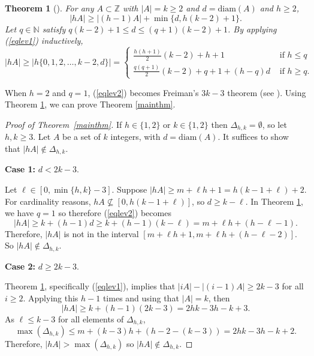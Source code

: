 \documentclass{daj}
\newtheorem{theorem}{Theorem}
\theoremstyle{definition}
\theoremstyle{remark}
\numberwithin{equation}{section}
\numberwithin{theorem}{section}
\newcommand{\N}{\mathbb{N}}
\newcommand{\Z}{\mathbb{Z}}
\newcommand{\diam}{\mathrm{diam}}
\begin{document}
\begin{theorem}[\cite{Lev96}]\label{thmlev}
    For any $A \subset \Z$ with $|A|=k\geq 2$ and $d = \diam(A)$ and $h \geq 2$, \begin{equation}\label{eqlev1}
        |hA| \geq |(h-1)A| + \min\{d,h(k-2)+1\}.
    \end{equation} Let $q \in \N$ satisfy $q(k-2)+ 1 \leq d \leq (q+1)(k-2)+1$. By applying (\ref{eqlev1}) inductively, \begin{equation}\label{eqlev2}
        |hA| \geq |h\{0,1,2,\ldots,k-2,d\}| = \begin{cases}
       \frac{h(h+1)}{2}(k-2)+h+1 &\text{ if } h \leq q \\
        \frac{q(q+1)}{2}(k-2)+q+1 + (h-q)d &\text{ if } h \geq q.
    \end{cases}
    \end{equation}
\end{theorem}

When $h=2$ and $q=1$, (\ref{eqlev2}) becomes Freiman's $3k-3$ theorem (see \cite[Theorem 1.13]{Nathanson96}). Using Theorem \ref{thmlev}, we can prove Theorem \ref{mainthm}.

\begin{proof}[Proof of Theorem~\ref{mainthm}]
    If $h \in \{1,2\}$ or $k \in \{1,2\}$ then $\Delta_{h,k} = \emptyset$, so let $h,k \geq 3$. Let $A$ be a set of $k$ integers, with $d = \diam(A)$. It suffices to show that $|hA| \not \in \Delta_{h,k}$.

    \textbf{Case 1:} $d < 2k-3$.

    Let $\ell \in [0,\min\{h,k\}-3]$. Suppose $|hA| \geq m+\ell h+1 = h(k-1 +\ell)+2$. For cardinality reasons, $hA \not \subseteq [0,h(k-1+\ell)]$, so $d \geq k-\ell$. In Theorem \ref{thmlev}, we have $q = 1$ so therefore (\ref{eqlev2}) becomes \[|hA| \geq k+(h-1)d \geq k + (h-1)(k-\ell) = m+\ell h+(h-\ell-1).\] Therefore, $|hA|$ is not in the interval $[m+\ell h+1,m+ \ell h+(h-  \ell-2)]$. So $|hA| \not \in \Delta_{h,k}$.

    \textbf{Case 2:} $d \geq 2k-3$.

    Theorem \ref{thmlev}, specifically (\ref{eqlev1}), implies that $|iA| -|(i-1)A| \geq  2k-3$ for all $i \geq 2$. Applying this $h-1$ times and using that $|A| = k$, then \begin{equation}\label{eqboundhA}
        |hA| \geq k + (h-1)(2k-3) = 2hk-3h-k+3. 
    \end{equation} As $\ell \leq k-3$ for all elements of $\Delta_{h,k}$, \[\max(\Delta_{h,k}) \leq m+(k-3) h + (h-2-(k-3)) = 2hk-3h-k+2.\]
    Therefore, $|hA| > \max(\Delta_{h,k})$ so $|hA|\not \in \Delta_{h,k}$. 
\end{proof}
\end{document}
